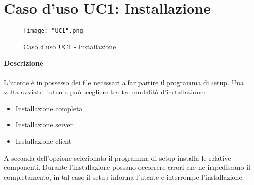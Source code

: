 \documentclass[a4paper]{report}
\begin{document}
		\section{Caso d'uso UC1: Installazione}
			\begin{figure}[H]
				\centering
				\texttt{[image: "UC1".png]}
				\caption{Caso d'uso UC1 - Installazione}
			\end{figure}
		 \textbf{Descrizione} \\ \\
		 L'utente è in possesso dei file necessari a far partire il programma di setup. Una volta avviato
		  l'utente può scegliere tra tre modalità d'installazione: 
		 \begin{itemize}
		 	\item Installazione completa
		 	\item Installazione server
		 	\item Installazione client
		 \end{itemize}
		 A seconda dell'opzione selezionata il programma di setup installa le relative componenti. Durante 
		 l'installazione possono occorrere errori che ne impediscano il completamento, in tal caso il setup
		 informa l'utente e interrompe l'installazione.
\end{document}

